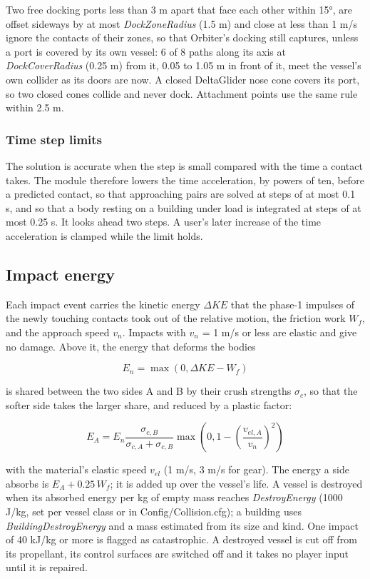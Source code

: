 \documentclass[Orbiter Technical Reference.tex]{subfiles}
\begin{document}
Two free docking ports less than 3 m apart that face each other within 15°, are offset sideways by at most \textit{DockZoneRadius} (1.5 m) and close at less than 1 m/s ignore the contacts of their zones, so that Orbiter's docking still captures, unless a port is covered by its own vessel: 6 of 8 paths along its axis at \textit{DockCoverRadius} (0.25 m) from it, 0.05 to 1.05 m in front of it, meet the vessel's own collider as its doors are now. A closed DeltaGlider nose cone covers its port, so two closed cones collide and never dock. Attachment points use the same rule within 2.5 m.


\subsubsection{Time step limits}
The solution is accurate when the step is small compared with the time a contact takes. The module therefore lowers the time acceleration, by powers of ten, before a predicted contact, so that approaching pairs are solved at steps of at most 0.1 s, and so that a body resting on a building under load is integrated at steps of at most 0.25 s. It looks ahead two steps. A user's later increase of the time acceleration is clamped while the limit holds.


\subsection{Impact energy}
Each impact event carries the kinetic energy $\Delta KE$ that the phase-1 impulses of the newly touching contacts took out of the relative motion, the friction work $W_{f}$, and the approach speed $v_{n}$. Impacts with $v_{n}$ = 1 m/s or less are elastic and give no damage. Above it, the energy that deforms the bodies

\[ E_{n} = \max(0, \Delta KE - W_{f}) \]

\noindent
is shared between the two sides A and B by their crush strengths $\sigma_{c}$, so that the softer side takes the larger share, and reduced by a plastic factor:

\[ E_{A} = E_{n} \frac{\sigma_{c,B}}{\sigma_{c,A} + \sigma_{c,B}} \max\left(0, 1 - \left(\frac{v_{el,A}}{v_{n}}\right)^{2}\right) \]

\noindent
with the material's elastic speed $v_{el}$ (1 m/s, 3 m/s for gear). The energy a side absorbs is $E_{A} + 0.25\,W_{f}$; it is added up over the vessel's life. A vessel is destroyed when its absorbed energy per kg of empty mass reaches \textit{DestroyEnergy} (1000 J/kg, set per vessel class or in Config/Collision.cfg); a building uses \textit{BuildingDestroyEnergy} and a mass estimated from its size and kind. One impact of 40 kJ/kg or more is flagged as catastrophic. A destroyed vessel is cut off from its propellant, its control surfaces are switched off and it takes no player input until it is repaired.
\end{document}
